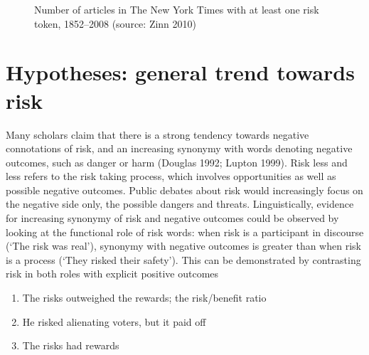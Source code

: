\begin{figure}[htb!]
\centering
{}
\caption[Number of articles with at least one risk token, 1852--2008]{Number of articles in The New York Times with at least one risk token, 1852--2008 (source: Zinn 2010)}
\label{fig:num_with_token}
\end{figure}

\section{Hypotheses: general trend towards risk}

Many scholars claim that there is a strong tendency towards negative connotations of risk, and an increasing synonymy with words denoting negative outcomes, such as danger or harm (Douglas 1992; Lupton 1999). Risk less and less refers to the risk taking process, which involves opportunities as well as possible negative outcomes. Public debates about risk would increasingly focus on the negative side only, the possible dangers and threats. Linguistically, evidence for increasing synonymy of risk and negative outcomes could be observed by looking at the functional role of risk words: when risk is a participant in discourse (`The risk was real'), synonymy with negative outcomes is greater than when risk is a process (`They risked their safety'). This can be demonstrated by contrasting risk in both roles with explicit positive outcomes

\begin{enumerate} [before=\color{black}\ttfamily] \setlength\itemsep{0em} \small
\item The risks outweighed the rewards; the risk\slash benefit ratio
\item He risked alienating voters, but it paid off
\item The risks had rewards
\end{enumerate}

